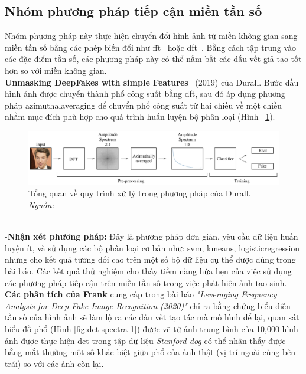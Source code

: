 \subsection{Nhóm phương pháp tiếp cận miền tần số}
Nhóm phương pháp này thực hiện chuyển đổi hình ảnh từ miền không gian sang miền tần số bằng các phép biến đổi như \gls{fft}~\cite{Arunachalam2013TheFF} hoặc \gls{dft}~\cite{1672377}.
Bằng cách tập trung vào các đặc điểm tần số, các phương pháp này có thể nắm bắt các dấu vết giả tạo tốt hơn so với miền không gian.\\
%
\textbf{Unmasking DeepFakes with simple Features}~\cite{durall2019unmasking} (2019) của Durall.
Bước đầu hình ảnh được chuyển thành phổ công suất bằng \gls{dft}, sau đó áp dụng phương pháp \gls{azimuthalaveraging} để chuyển phổ công suất từ hai chiều về một chiều nhằm mục đích phù hợp cho quá trình huấn luyện bộ phân loại (Hình ~\ref{fig:model-unmasking-deepfakes-1}).
%
\begin{figure}[h]
	\centering
	\includegraphics[width=1.0\linewidth]{Images/model-unmasking-deepfakes-1.png}
	\begin{minipage}{0.9\linewidth}
		\caption{Tổng quan về quy trình xử lý trong phương pháp của Durall. \textit{Nguồn: \cite{durall2019unmasking}}}
		\label{fig:model-unmasking-deepfakes-1}
	\end{minipage}
\end{figure}\\
%
%
-\textbf{Nhận xét phương pháp:}
Đây là phương pháp đơn giản, yêu cầu dữ liệu huấn luyện ít, và sử dụng các bộ phân loại cơ bản như: \gls{svm}, \gls{kmeans}, \gls{logisticregression} nhưng cho kết quả tương đối cao trên một số bộ dữ liệu cụ thể được dùng trong bài báo. Các kết quả thử nghiệm cho thấy tiềm năng hứa hẹn của việc sử dụng các phương pháp tiếp cận trên miền tần số trong việc phát hiện ảnh tạo sinh.\\
%
\textbf{Các phân tích của Frank}\cite{Frank2020LeveragingFA} cung cấp trong bài báo \textit{"Leveraging Frequency Analysis for Deep Fake Image Recognition (2020)"} chỉ ra bằng chứng biểu diễn tần số của hình ảnh sẽ làm lộ ra các dấu vết tạo tác mà mô hình để lại, quan sát biểu đồ phổ (Hình \ref{fig:dct-spectra-1}) được vẽ từ ảnh trung bình của 10,000 hình ảnh được thực hiện \gls{dct} trong tập dữ liệu \textit{Stanford dog} có thể nhận thấy được bằng mắt thường một số khác biệt giữa phổ của ảnh thật (vị trí ngoài cùng bên trái) so với các ảnh còn lại.
